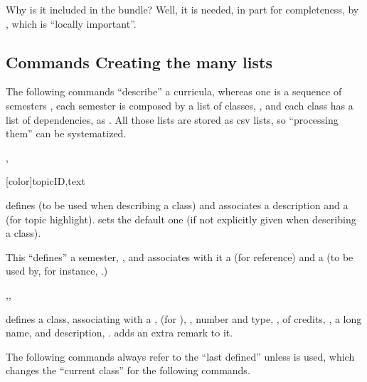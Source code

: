 \documentclass[article,nogeometry,english,tocdepth=3,secdepth=3]{ufrgscca} %
\begin{document}
Why is it included in the bundle? Well, it is needed, in part for completeness, by , which is “locally important”.

\subsection{Commands Creating the many lists}
The following commands “describe” a curricula, whereas one is a sequence of semesters , each semester is composed by a list of classes, , and each class has a list of dependencies,  as \tsmacro{\depdef}{}. All those lists are stored as csv lists, so “processing them” can be systematized.

\begin{codedescribe}{\topicdef,}
\begin{codesyntax}%
    \tsmacro{\topicdef}[color]{topicID,text}
\end{codesyntax}
\tsmacro{\topicdef}{} defines  (to be used when describing a class) and associates a  description and a  (for topic highlight).  sets the default one (if not explicitly given when describing a class).
\end{codedescribe}


\begin{codedescribe}{\semdef}
    \begin{codesyntax}%
    \end{codesyntax}
This “defines” a semester, , and associates with it a  (for reference) and a  (to be used by, for instance, .)
\end{codedescribe}


\begin{codedescribe}{\classdef,\setclass,\classremark}
    \begin{codesyntax}%
    \end{codesyntax}
\tsmacro{\classdef}{} defines a class, associating with a ,  (for ), , number and type, , of credits, , a long name,  and description, . \tsmacro{\classremark}{} adds an extra remark to it.

The following commands always refer to the “last defined” \tsmacro{\classdef}{} unless \tsmacro{\setclass}{} is used, which changes the “current class” for the following commands.
\end{codedescribe}
\end{document}

